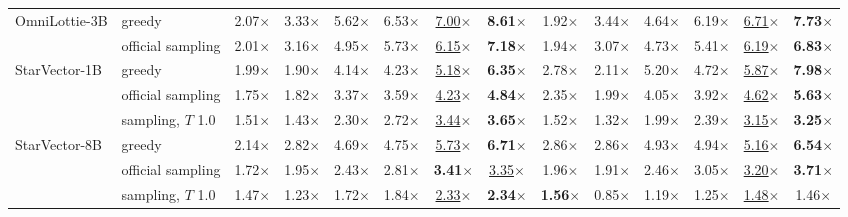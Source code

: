 \begin{table}[t]
\begin{tabular*}{\textwidth}{@{\extracolsep{\fill}}ll*{12}{c}@{}}
\addlinespace[2pt]
OmniLottie-3B & greedy & 2.07$\times$ & 3.33$\times$ & 5.62$\times$ & 6.53$\times$ & \underline{7.00}$\times$ & \textbf{8.61}$\times$ & 1.92$\times$ & 3.44$\times$ & 4.64$\times$ & 6.19$\times$ & \underline{6.71}$\times$ & \textbf{7.73}$\times$ \\
 & official sampling & 2.01$\times$ & 3.16$\times$ & 4.95$\times$ & 5.73$\times$ & \underline{6.15}$\times$ & \textbf{7.18}$\times$ & 1.94$\times$ & 3.07$\times$ & 4.73$\times$ & 5.41$\times$ & \underline{6.19}$\times$ & \textbf{6.83}$\times$ \\
\addlinespace[2pt]
StarVector-1B & greedy & 1.99$\times$ & 1.90$\times$ & 4.14$\times$ & 4.23$\times$ & \underline{5.18}$\times$ & \textbf{6.35}$\times$ & 2.78$\times$ & 2.11$\times$ & 5.20$\times$ & 4.72$\times$ & \underline{5.87}$\times$ & \textbf{7.98}$\times$ \\
 & official sampling & 1.75$\times$ & 1.82$\times$ & 3.37$\times$ & 3.59$\times$ & \underline{4.23}$\times$ & \textbf{4.84}$\times$ & 2.35$\times$ & 1.99$\times$ & 4.05$\times$ & 3.92$\times$ & \underline{4.62}$\times$ & \textbf{5.63}$\times$ \\
 & sampling, $T$ 1.0 & 1.51$\times$ & 1.43$\times$ & 2.30$\times$ & 2.72$\times$ & \underline{3.44}$\times$ & \textbf{3.65}$\times$ & 1.52$\times$ & 1.32$\times$ & 1.99$\times$ & 2.39$\times$ & \underline{3.15}$\times$ & \textbf{3.25}$\times$ \\
\addlinespace[2pt]
StarVector-8B & greedy & 2.14$\times$ & 2.82$\times$ & 4.69$\times$ & 4.75$\times$ & \underline{5.73}$\times$ & \textbf{6.71}$\times$ & 2.86$\times$ & 2.86$\times$ & 4.93$\times$ & 4.94$\times$ & \underline{5.16}$\times$ & \textbf{6.54}$\times$ \\
 & official sampling & 1.72$\times$ & 1.95$\times$ & 2.43$\times$ & 2.81$\times$ & \textbf{3.41}$\times$ & \underline{3.35}$\times$ & 1.96$\times$ & 1.91$\times$ & 2.46$\times$ & 3.05$\times$ & \underline{3.20}$\times$ & \textbf{3.71}$\times$ \\
 & sampling, $T$ 1.0 & 1.47$\times$ & 1.23$\times$ & 1.72$\times$ & 1.84$\times$ & \underline{2.33}$\times$ & \textbf{2.34}$\times$ & \textbf{1.56}$\times$ & 0.85$\times$ & 1.19$\times$ & 1.25$\times$ & \underline{1.48}$\times$ & 1.46$\times$ \\
\bottomrule
\end{tabular*}
\end{table}
